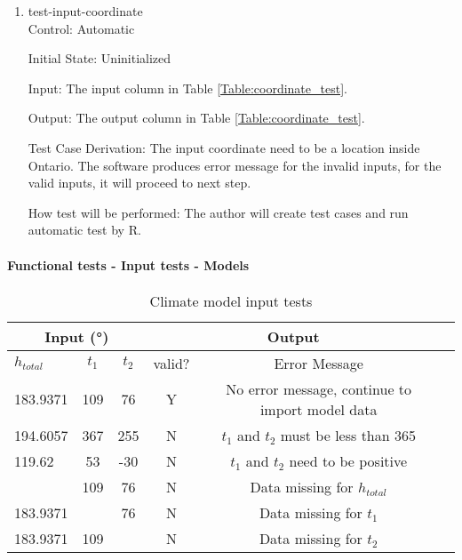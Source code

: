 \documentclass[12pt, titlepage]{article}
\begin{document}
\begin{enumerate}

\item{test-input-coordinate\\}
Control: Automatic
					
Initial State: Uninitialized
					
Input: The input column in Table \ref{Table:coordinate_test}.
					
Output: The output column in Table \ref{Table:coordinate_test}. 

Test Case Derivation: The input coordinate need to be a location inside Ontario. The software produces error message for the invalid inputs, for the valid inputs, it will proceed to next step. 
					
How test will be performed: The author will create test cases and run automatic test by R.
\end{enumerate}

\paragraph{Functional tests - Input tests - Models}

\begin{center}
\begin{table}[h]
\resizebox{\textwidth}{!}
{ %
    \begin{tabular}{ lccccc }
    \hline
      \multicolumn{3}{c|}{Input (\si[per-mode=symbol] {\degree}) }                            & \multicolumn{2}{c}{Output} \\ \hline
        $h_{total}$   &   $t_1$   & $t_2$  &   valid?   &   Error Message \\ \hline
    
       183.9371  & 109 & 76 &  Y  & No error message, continue to import model data  \\    \hline
       194.6057  & 367 & 255 &  N  &  $t_1$ and $t_2$ must be less than 365  \\    \hline
       119.62  & 53 & -30 &  N  & $t_1$ and $t_2$ need to be positive                 \\    \hline  
         & 109 & 76 &  N  & Data missing for $h_{total}$                \\    \hline  
       183.9371  &  & 76 &   N  & Data missing for  $t_1$                    \\    \hline
       183.9371  & 109 &  &  N  & Data missing for  $t_2$                       \\    \hline
    \end{tabular} %
}
\caption{Climate model input tests}
\label{Table:climate_test}
\end{table}
\end{center}
\end{document}
